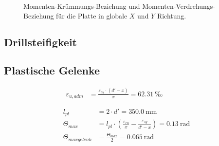 \documentclass[
  11pt,
  letterpaper,
]{scrreprt}
\begin{document}
\begin{figure}[H]

\begin{minipage}{0.50\linewidth}



\end{minipage}%
%
\begin{minipage}{0.50\linewidth}



\end{minipage}%

\caption{\label{fig-tho_biegung}Momenten-Krümmungs-Beziehung und
Momenten-Verdrehungs-Beziehung für die Platte in globale \(X\) und \(Y\)
Richtung.}

\end{figure}%

\subsection{Drillsteifigkeit}\label{drillsteifigkeit}

\subsection{Plastische Gelenke}\label{plastische-gelenke}

\[
\begin{aligned}
\varepsilon_{u , adm}& = \frac{\varepsilon_{cu} \cdot \left({d}' - x\right)}{x} = 62.31 \ \mathrm{‰} \quad &  \quad &  
 \end{aligned}
\]

\[
\begin{aligned}
l_{pl}& = 2 \cdot {d}' = 350.0 \ \mathrm{mm} \\ 
\Theta_{max}& = l_{pl} \cdot \left(\frac{\varepsilon_{cu}}{x} - \frac{\varepsilon_{sy}}{{d}' - x}\right) = 0.13 \ \mathrm{rad} \\ 
\Theta_{max gelenk}& = \frac{\Theta_{max}}{2} = 0.065 \ \mathrm{rad} \end{aligned}
\]
\end{document}
